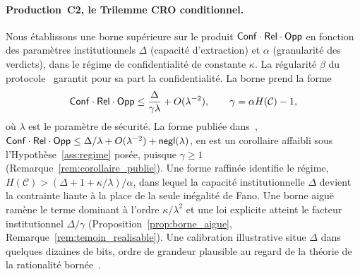 \begin{sloppypar}
\paragraph{Production~C2, le Trilemme CRO conditionnel.}
Nous \'etablissons une borne sup\'erieure sur le produit
$\mathsf{Conf} \cdot \mathsf{Rel} \cdot \mathsf{Opp}$ en fonction des param\`etres institutionnels
$\Delta$ (capacit\'e d'extraction) et $\alpha$ (granularit\'e des verdicts), dans le
r\'egime de confidentialit\'e de constante $\kappa$. La r\'egularit\'e $\beta$ du
protocole~\cite{Tsybakov2009} garantit pour sa part la confidentialit\'e. La borne prend la forme
\begin{equation}
\label{eq:cro_bound_intro}
\mathsf{Conf} \cdot \mathsf{Rel} \cdot \mathsf{Opp} \leq
\frac{\Delta}{\gamma\lambda} + O(\lambda^{-2}),
\qquad \gamma = \alpha H(\mathcal{C}) - 1,
\end{equation}
o\`u $\lambda$ est le param\`etre de s\'ecurit\'e. La forme publi\'ee
dans~\cite{MINKA2026CRO}, $\mathsf{Conf} \cdot \mathsf{Rel} \cdot \mathsf{Opp} \leq \Delta/\lambda +
O(\lambda^{-2}) + \mathsf{negl}(\lambda)$, en est un corollaire affaibli sous l'Hypoth\`ese~\ref{ass:regime}
pos\'ee, puisque $\gamma \geq 1$ (Remarque~\ref{rem:corollaire_publie}).
Une forme raffin\'ee identifie le r\'egime, $H(\mathcal{C}) > (\Delta + 1 +
\kappa/\lambda)/\alpha$, dans lequel la capacit\'e institutionnelle $\Delta$
devient la contrainte liante \`a la place de la seule in\'egalit\'e de Fano. Une
borne aigu\"e ram\`ene le terme dominant \`a l'ordre $\kappa/\lambda^2$ et une loi explicite
atteint le facteur institutionnel $\Delta/\gamma$ (Proposition~\ref{prop:borne_aigue},
Remarque~\ref{rem:temoin_realisable}). Une
calibration illustrative situe $\Delta$ dans quelques dizaines de bits,
ordre de grandeur plausible au regard de la th\'eorie de la rationalit\'e
born\'ee~\cite{Simon82,Kahneman11}.


\end{sloppypar}
